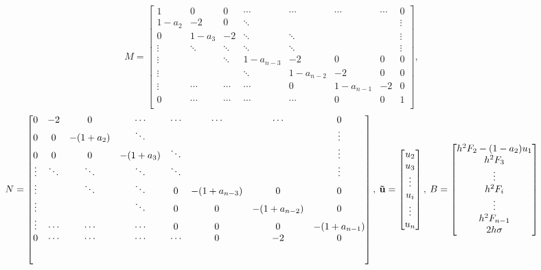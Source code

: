 \documentclass[8pt, a4paper]{article}
\begin{document}
  \setlength{\extrarowheight}{1.25\baselineskip}
  \begin{equation}
  M=
  \begin{bmatrix}
  1 & 0 & 0 & \cdots & \cdots & \cdots & \cdots & 0\\
  1-a_2 & -2 & 0 & \ddots & & & & \vdots\\
  0 & 1-a_3 & -2 & \ddots & \ddots & &  & \vdots\\
  \vdots & \ddots & \ddots & \ddots & \ddots & & & \vdots\\
  \vdots & & \ddots & 1-a_{n-3} & -2 & 0 & 0 & 0 \\
  \vdots & & & \ddots & 1-a_{n-2} & -2 & 0 & 0\\
  \vdots & \cdots & \cdots & \cdots & 0 & 1-a_{n-1} & -2 & 0\\
  0 & \cdots & \cdots & \cdots & \cdots & 0 & 0 & 1\\[5ex]
  \end{bmatrix},
  \end{equation}
  \begin{equation}
  N=
  \begin{bmatrix}
  0 & -2 & 0 & \cdots & \cdots & \cdots & \cdots & 0\\
  0 & 0 & -(1+a_2) & \ddots & & & & \vdots\\
  0 & 0 & 0 & -(1+a_3) & \ddots & &  & \vdots\\
  \vdots & \ddots & \ddots & \ddots & \ddots & & & \vdots\\
  \vdots & & \ddots & \ddots & 0 & -(1+a_{n-3}) & 0 & 0 \\
  \vdots & & & \ddots & 0 & 0 & -(1+a_{n-2}) & 0\\
  \vdots & \cdots & \cdots & \cdots & 0 & 0 & 0 & -(1+a_{n-1})\\
  0 & \cdots & \cdots & \cdots & \cdots & 0 & -2 & 0\\[5ex]
  \end{bmatrix},\:
  \mathbf{\vec{u}}=
  \begin{bmatrix}
  u_2\\
  u_3\\
  \vdots\\
  u_i\\
  \vdots\\
  u_n
  \end{bmatrix},\:
  B=
  \begin{bmatrix}
  h^2F_2-(1-a_2)u_1\\
  h^2F_3\\
  \vdots\\
  h^2F_i\\
  \vdots\\
  h^2F_{n-1}\\
  2h\sigma
  \end{bmatrix}
  \end{equation}
\end{document}
